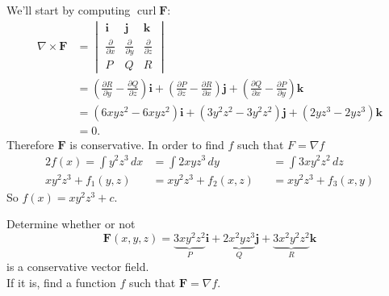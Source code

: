\documentclass{article}
\newenvironment{problem}[2][Problem]{\begin{trivlist}
\item[\hskip \labelsep {\bfseries #1}\hskip \labelsep {\bfseries #2.}]}{\end{trivlist}}
\newenvironment{solution}[1][Solution.]{\begin{trivlist}
\item[\hskip \labelsep {\bfseries #1}]}{\end{trivlist}}
\begin{document}
\begin{solution} $ $\\
  We'll start by computing $\operatorname{curl}\mathbf F$: \begin{align*}
    \nabla \times \mathbf F &= \begin{vmatrix}
      \mathbf i & \mathbf j & \mathbf k
      \\
      \displaystyle\frac{\partial}{\partial x}
      & \displaystyle\frac{\partial}{\partial y}
      & \displaystyle\frac{\partial}{\partial z}
      \\
      P & Q & R
    \end{vmatrix} \\
    &=
    \left(\frac{\partial R}{\partial y} - \frac{\partial Q}{\partial z}\right)\mathbf i +
    \left(\frac{\partial P}{\partial z} - \frac{\partial R}{\partial x}\right)\mathbf j +
    \left(\frac{\partial Q}{\partial x} - \frac{\partial P}{\partial y}\right)\mathbf k
    \\
    &=
    \left(6xyz^2 - 6xyz^2\right)\mathbf i +
    \left(3y^2z^2 - 3y^2z^2\right)\mathbf j +
    \left(2yz^3 - 2yz^3\right)\mathbf k
    \\
    &= 0.
  \end{align*}
  Therefore $\mathbf F$ is conservative. In order to find $f$ such that
  $F = \nabla f$ \begin{alignat*}{2}
    f(x) = \int y^2z^3\,dx &=
    \int 2xyz^3\,dy &&=
    \int 3xy^2z^2\,dz
    \\
    xy^2z^3 + f_1(y,z) &=
    xy^2z^3 + f_2(x,z) &&=
    xy^2z^3 + f_3(x,y)
  \end{alignat*}
  So $f(x) = xy^2z^3 + c$.
\end{solution}

\begin{problem}{13.5.13}
  Determine whether or not \[
    \mathbf F(x,y,z)
      = \underbrace{3xy^2z^2}_P\mathbf i
      + \underbrace{2x^2yz^3}_Q\mathbf j
      + \underbrace{3x^2y^2z^2}_R\mathbf k
  \] is a conservative vector field.
  \\
  If it is, find a function $f$ such that $\mathbf F = \nabla f$.
\end{problem}
\end{document}
